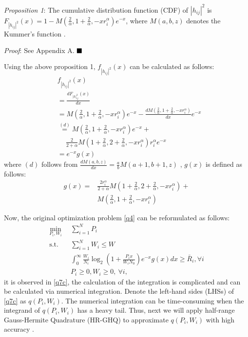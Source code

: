 \documentclass[journal]{IEEEtran}
\begin{document}
\textit{Proposition 1}: The cumulative distribution function (CDF) of $\left|h_{ij} \right|^2$ is $F_{\left|h_{ij} \right|^2}\left(x\right) = 1 - M\left(\frac{2}{\alpha}, 1 + \frac{2}{\alpha}, - x r_i^{\alpha}\right)e^{-x}$, where $M\left(a,b,z\right)$ denotes the Kummer's function \cite{MAbramowitz}.


\textit{Proof}: See Appendix A.  $\hfill\blacksquare$

Using the above proposition 1, $f_{\left|h_{ij} \right|^2} \left(x\right)$ can be calculated as follows:
\begin{align}
&f_{\left|h_{ij} \right|^2} \left(x\right)\nonumber \\ &= \frac{d F_{\left|h\right|_{ij}^2}\left(x\right)}{d x} \nonumber \\
&=M\left(\frac{2}{\alpha}, 1 + \frac{2}{\alpha}, -xr_i^{\alpha}\right)e^{-x} -\frac{d M\left(\frac{2}{\alpha}, 1 + \frac{2}{\alpha}, -x r_i^{\alpha}\right)}{d x} e^{-x} \nonumber \\
&\overset{\left(d\right)}{=} M\left(\frac{2}{\alpha}, 1 + \frac{2}{\alpha}, -xr_i^{\alpha}\right)e^{-x} + \nonumber \\ & \quad \ \frac{2}{2+\alpha}M\left(1 + \frac{2}{\alpha}, 2+\frac{2}{\alpha}, -xr_i^{\alpha}\right)r_i^{\alpha}e^{-x} \nonumber \\
& = e^{-x}g\left(x\right)
\end{align}
where $\left(d\right)$ follows from $\frac{d M\left(a, b, z\right)}{d x} = \frac{a}{b}M\left(a+1, b+1, z\right)$ \cite[13.4.8]{MAbramowitz}, $g\left(x\right)$ is defined as follows:
\begin{align}
g\left(x\right) =& \frac{2r_i^{\alpha}}{2+\alpha} M\left(1 + \frac{2}{\alpha}, 2+ \frac{2}{\alpha}, -xr_i^{\alpha}\right) + \nonumber \\ & M\left(\frac{2}{\alpha}, 1 + \frac{2}{\alpha}, -xr_i^{\alpha}\right)
\end{align}

Now, the original optimization problem \eqref{q4} can be reformulated as follows:
\begin{subequations}\label{q7}
	\begin{align}
	\min_{P_i, W_i}\ & \sum\limits_{i = 1}^{N} P_i \label{q7a} \\ \mbox{s.t.} \quad &  \sum\limits_{i = 1}^{N} W_i \leq W \label{q7b} \\ \quad &  \int_{0}^{\infty} \frac{W_i}{N_i} \log_2\left(1 + \frac{P_i x}{W_i N_0}\right) e^{-x}g\left(x\right) dx \geq \bar{R}_i, \forall i \label{q7c}\\
	& P_i \geq 0, W_i \geq 0, \ \forall i, \label{q7d}
	\end{align}
\end{subequations}
it is observed in \eqref{q7c}, the calculation of the integration is complicated and can be calculated via numerical integration. Denote the left-hand sides (LHSs) of \eqref{q7c} as $q\left(P_i, W_i\right)$. The numerical integration can be time-consuming when the integrand of $q\left(P_i, W_i\right)$ has a heavy tail. Thus, next we will apply half-range Gauss-Hermite Quadrature (HR-GHQ) to approximate $q\left(P_i, W_i\right)$ with high accuracy \cite{JSBall,NMSteen}.
\end{document}
